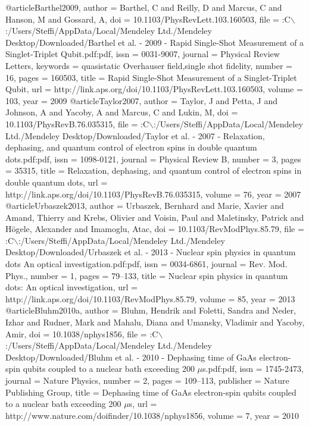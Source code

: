 @article{Barthel2009,
author = {Barthel, C and Reilly, D and Marcus, C and Hanson, M and Gossard, A},
doi = {10.1103/PhysRevLett.103.160503},
file = {:C$\backslash$:/Users/Steffi/AppData/Local/Mendeley Ltd./Mendeley Desktop/Downloaded/Barthel et al. - 2009 - Rapid Single-Shot Measurement of a Singlet-Triplet Qubit.pdf:pdf},
issn = {0031-9007},
journal = {Physical Review Letters},
keywords = {quasistatic Overhauser field,single shot fidelity},
number = {16},
pages = {160503},
title = {{Rapid Single-Shot Measurement of a Singlet-Triplet Qubit}},
url = {http://link.aps.org/doi/10.1103/PhysRevLett.103.160503},
volume = {103},
year = {2009}
}
@article{Taylor2007,
author = {Taylor, J and Petta, J and Johnson, A and Yacoby, A and Marcus, C and Lukin, M},
doi = {10.1103/PhysRevB.76.035315},
file = {:C$\backslash$:/Users/Steffi/AppData/Local/Mendeley Ltd./Mendeley Desktop/Downloaded/Taylor et al. - 2007 - Relaxation, dephasing, and quantum control of electron spins in double quantum dots.pdf:pdf},
issn = {1098-0121},
journal = {Physical Review B},
number = {3},
pages = {35315},
title = {{Relaxation, dephasing, and quantum control of electron spins in double quantum dots}},
url = {http://link.aps.org/doi/10.1103/PhysRevB.76.035315},
volume = {76},
year = {2007}
}
@article{Urbaszek2013,
author = {Urbaszek, Bernhard and Marie, Xavier and Amand, Thierry and Krebs, Olivier and Voisin, Paul and Maletinsky, Patrick and H{\"{o}}gele, Alexander and Imamoglu, Atac},
doi = {10.1103/RevModPhys.85.79},
file = {:C$\backslash$:/Users/Steffi/AppData/Local/Mendeley Ltd./Mendeley Desktop/Downloaded/Urbaszek et al. - 2013 - Nuclear spin physics in quantum dots An optical investigation.pdf:pdf},
issn = {0034-6861},
journal = {Rev. Mod. Phys.},
number = {1},
pages = {79--133},
title = {{Nuclear spin physics in quantum dots: An optical investigation}},
url = {http://link.aps.org/doi/10.1103/RevModPhys.85.79},
volume = {85},
year = {2013}
}
@article{Bluhm2010a,
author = {Bluhm, Hendrik and Foletti, Sandra and Neder, Izhar and Rudner, Mark and Mahalu, Diana and Umansky, Vladimir and Yacoby, Amir},
doi = {10.1038/nphys1856},
file = {:C$\backslash$:/Users/Steffi/AppData/Local/Mendeley Ltd./Mendeley Desktop/Downloaded/Bluhm et al. - 2010 - Dephasing time of GaAs electron-spin qubits coupled to a nuclear bath exceeding 200 $\mu$s.pdf:pdf},
issn = {1745-2473},
journal = {Nature Physics},
number = {2},
pages = {109--113},
publisher = {Nature Publishing Group},
title = {{Dephasing time of GaAs electron-spin qubits coupled to a nuclear bath exceeding 200 $\mu$s}},
url = {http://www.nature.com/doifinder/10.1038/nphys1856},
volume = {7},
year = {2010}
}
